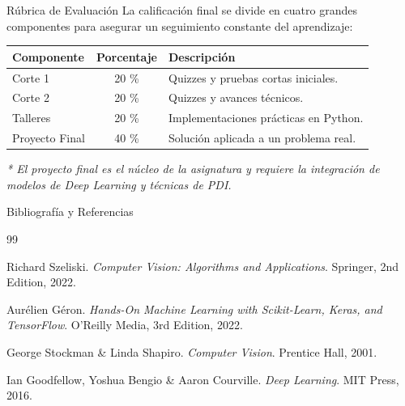 \documentclass[10pt]{beamer}
\begin{document}
\begin{frame}{Rúbrica de Evaluación}
    La calificación final se divide en cuatro grandes componentes para asegurar un seguimiento constante del aprendizaje:

    \begin{table}
        \centering
        \renewcommand{\arraystretch}{1.3}
        \begin{tabular}{l c p{5cm}}
            \toprule
            \textbf{Componente} & \textbf{Porcentaje} & \textbf{Descripción} \\
            \midrule
            Corte 1 & 20 \% & Quizzes y pruebas cortas iniciales. \\
            Corte 2 & 20 \% & Quizzes y avances técnicos. \\
            Talleres & 20 \% & Implementaciones prácticas en Python. \\
            Proyecto Final & 40 \% & Solución aplicada a un problema real. \\
            \bottomrule
        \end{tabular}
    \end{table}
    
    \footnotesize{\textit{* El proyecto final es el núcleo de la asignatura y requiere la integración de modelos de Deep Learning y técnicas de PDI.}}
\end{frame}

\begin{frame}{Bibliografía y Referencias}
    \begin{thebibliography}{99}
        
            Richard Szeliski.
            \newblock \textit{Computer Vision: Algorithms and Applications}.
            \newblock Springer, 2nd Edition, 2022.
            
            Aurélien Géron.
            \newblock \textit{Hands-On Machine Learning with Scikit-Learn, Keras, and TensorFlow}.
            \newblock O'Reilly Media, 3rd Edition, 2022.

            George Stockman \& Linda Shapiro.
            \newblock \textit{Computer Vision}.
            \newblock Prentice Hall, 2001.

            Ian Goodfellow, Yoshua Bengio \& Aaron Courville.
            \newblock \textit{Deep Learning}.
            \newblock MIT Press, 2016.
            
    \end{thebibliography}
\end{frame}
\end{document}
